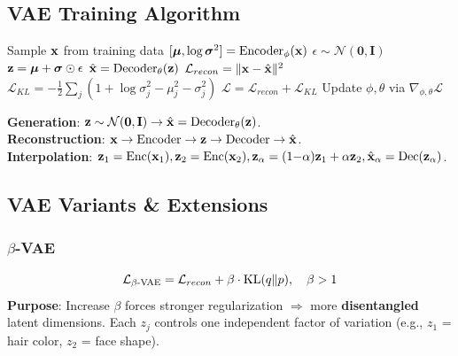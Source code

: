 \subsection{VAE Training Algorithm}
\begin{algorithm}[H]
\caption{VAE Training (1 step)}\small
\begin{algorithmic}[1]
\State Sample $\mathbf{x}$ from training data
\State $[\boldsymbol{\mu}, \log\boldsymbol{\sigma}^2] = \text{Encoder}_\phi(\mathbf{x})$ 
\State $\epsilon \sim \mathcal{N}(\mathbf{0}, \mathbf{I})$ 
\State $\mathbf{z} = \boldsymbol{\mu} + \boldsymbol{\sigma} \odot \epsilon$ 
\State $\hat{\mathbf{x}} = \text{Decoder}_\theta(\mathbf{z})$ 
\State $\mathcal{L}_{recon} = \|\mathbf{x} - \hat{\mathbf{x}}\|^2$ 
\State $\mathcal{L}_{KL} = -\frac{1}{2}\sum_j(1+\log\sigma_j^2-\mu_j^2-\sigma_j^2)$
\State $\mathcal{L} = \mathcal{L}_{recon} + \mathcal{L}_{KL}$ 
\State Update $\phi, \theta$ via $\nabla_{\phi,\theta}\mathcal{L}$ 
\end{algorithmic}
\end{algorithm}

\textbf{Generation}: $\mathbf{z} \sim \mathcal{N}(\mathbf{0}, \mathbf{I}) \to \hat{\mathbf{x}} = \text{Decoder}_\theta(\mathbf{z})$.\\
\textbf{Reconstruction}: $\mathbf{x} \to \text{Encoder} \to \mathbf{z} \to \text{Decoder} \to \hat{\mathbf{x}}$.\\
\textbf{Interpolation}: $\mathbf{z}_1 = \text{Enc}(\mathbf{x}_1), \mathbf{z}_2 = \text{Enc}(\mathbf{x}_2), \mathbf{z}_\alpha = (1{-}\alpha)\mathbf{z}_1 + \alpha\mathbf{z}_2, \hat{\mathbf{x}}_\alpha = \text{Dec}(\mathbf{z}_\alpha)$.

\subsection{VAE Variants \& Extensions}

\subsubsection{$\beta$-VAE}
\begin{equation}
\mathcal{L}_{\beta\text{-VAE}} = \mathcal{L}_{recon} + \beta \cdot \text{KL}(q \| p), \quad \beta > 1
\end{equation}
\textbf{Purpose}: Increase $\beta$ forces stronger regularization $\Rightarrow$ more \textbf{disentangled} latent dimensions. Each $z_j$ controls one independent factor of variation (e.g., $z_1$ = hair color, $z_2$ = face shape).

